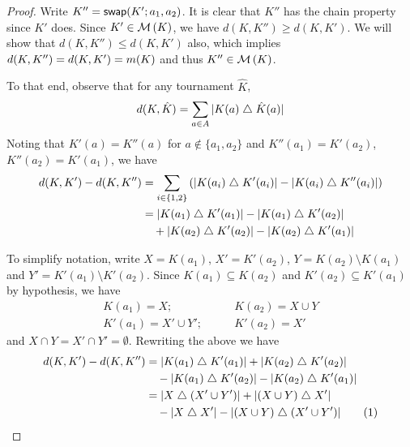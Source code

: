 \begin{proof}
    Write $K'' = \mathsf{swap}({K'}; {a_1}, {a_2})$. It is clear that $K''$ has the chain
    property since $K'$ does. Since $K' \in \operatorname{\mathcal{M}}\left({K}\right)$, we have $d(K, K'') \ge
    d(K, K')$. We will show that $d(K, K'') \le d(K, K')$ also, which implies
    $d(K, K'') = d(K, K') = m({K})$ and thus $K'' \in \operatorname{\mathcal{M}}\left({K}\right)$.

    To that end, observe that for any tournament $\hat{K}$,
    \[
        d(K, \hat{K}) = \sum_{a \in A}{|K(a) \mathrel{\triangle} \hat{K}(a)|}
    \]
    Noting that $K'(a) = K''(a)$ for $a \notin \{a_1,a_2\}$ and $K''(a_1) =
    K'(a_2)$, $K''(a_2) = K'(a_1)$, we have
    \begin{align*}
        d(K, K') - d(K, K'')
        &= \sum_{i \in \{1,2\}}{\left(
            |K(a_i) \mathrel{\triangle} K'(a_i)| - |K(a_i) \mathrel{\triangle} K''(a_i)|
        \right)} \\
        &= |K(a_1) \mathrel{\triangle} K'(a_1)| - |K(a_1) \mathrel{\triangle} K'(a_2)| \\
        &\quad + |K(a_2) \mathrel{\triangle} K'(a_2)| - |K(a_2) \mathrel{\triangle} K'(a_1)|
    \end{align*}

    To simplify notation, write $X = K(a_1)$, $X' = K'(a_2)$, $Y = K(a_2)
    \setminus K(a_1)$ and $Y' = K'(a_1) \setminus K'(a_2)$. Since $K(a_1)
    \subseteq K(a_2)$ and $K'(a_2) \subseteq K'(a_1)$ by hypothesis, we have
    \begin{align*}
        K(a_1) = X;
            &\quad\quad
        K(a_2) = X \cup Y \\
        K'(a_1) = X' \cup Y';
            &\quad\quad
        K'(a_2) = X'
    \end{align*}
    and $X \cap Y = X' \cap Y' = \emptyset$. Rewriting the above we have
    \begin{align*}
        d(K, K') - d(K, K'')
        &= |K(a_1) \symdiff K'(a_1)|
           + |K(a_2) \symdiff K'(a_2)|
            \\
        &  \quad
           - |K(a_1) \symdiff K'(a_2)|
           - |K(a_2) \symdiff K'(a_1)| \\
        &= |X \symdiff (X' \cup Y')|
           + |(X \cup Y) \symdiff X'| \\
        &  \quad
           -
           |X \symdiff X'|
           - |(X \cup Y) \symdiff (X' \cup Y')|
           \addtocounter{equation}{1}\tag{\theequation}
           \label{tourn_eqn_swap_lemma_symdiffs}
    \end{align*}


\end{proof}
